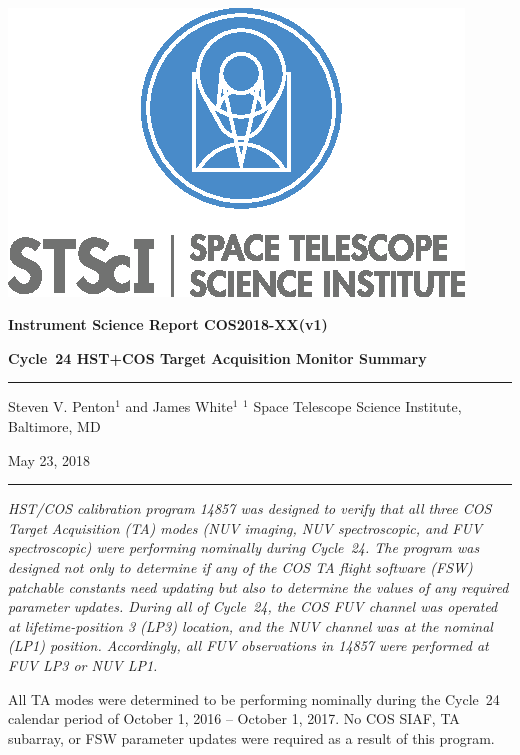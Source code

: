 \documentclass[12pt]{reportj}
\begin{document}
~\\

\vspace{-2.5cm}
\noindent\includegraphics*[width=0.295\linewidth]{new_st_logo.eps}

\vspace{-0.5cm}

\begin{flushright}
{\bf Instrument Science Report COS2018-XX(v1)}

\vspace{1.0cm}
{\bf\Huge Cycle~24 HST+COS Target Acquisition Monitor Summary}

\rule{0.25\linewidth}{0.5pt}

\vspace{0.4cm}
Steven V. Penton$^1$ and James White$^1$
\linebreak
\newline
\footnotesize{$^1$ Space Telescope Science Institute, Baltimore, MD}
\vspace{0.5cm}

May 23, 2018
\end{flushright}
\vspace{-0.3cm}
\noindent\rule{\linewidth}{1.0pt}

{\it \noindent
HST/COS calibration program 14857 was designed to verify that all three COS Target Acquisition (TA) modes (NUV imaging, NUV spectroscopic, and FUV spectroscopic)
 were performing nominally during Cycle~24. The program was designed not only to determine if any of the COS TA flight software (FSW) patchable constants need updating but also to determine the values of any required parameter updates.
During all of Cycle~24, the COS FUV channel was operated at lifetime-position 3 (LP3) location, and the NUV channel was at the nominal (LP1) position. Accordingly, all FUV observations in 14857 were performed at FUV LP3 or NUV LP1.

All TA modes were determined to be performing nominally during the Cycle~24 calendar period of October 1, 2016 -- October 1, 2017. No COS SIAF, TA subarray, or FSW parameter updates were required as a result of this program. }
\end{document}
